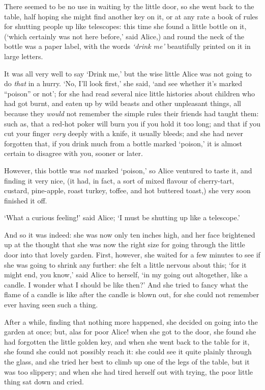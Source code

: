   There seemed to be no use in waiting by the little door, so she
went back to the table, half hoping she might find another key on
it, or at any rate a book of rules for shutting people up like
telescopes:  this time she found a little bottle on it, (`which
certainly was not here before,' said Alice,) and round the neck
of the bottle was a paper label, with the words {\it `drink me'}
beautifully printed on it in large letters.

  It was all very well to say `Drink me,' but the wise little
Alice was not going to do {\it that} in a hurry.  `No, I'll look
first,' she said, `and see whether it's marked ``poison'' or not';
for she had read several nice little histories about children who
had got burnt, and eaten up by wild beasts and other unpleasant
things, all because they {\it would} not remember the simple rules
their friends had taught them:  such as, that a red-hot poker
will burn you if you hold it too long; and that if you cut your
finger {\it very} deeply with a knife, it usually bleeds; and she had
never forgotten that, if you drink much from a bottle marked
`poison,' it is almost certain to disagree with you, sooner or
later.

  However, this bottle was {\it not} marked `poison,' so Alice ventured
to taste it, and finding it very nice, (it had, in fact, a sort
of mixed flavour of cherry-tart, custard, pine-apple, roast
turkey, toffee, and hot buttered toast,) she very soon finished
it off.

  `What a curious feeling!' said Alice; `I must be shutting up
like a telescope.'

  And so it was indeed:  she was now only ten inches high, and
her face brightened up at the thought that she was now the right
size for going through the little door into that lovely garden.
First, however, she waited for a few minutes to see if she was
going to shrink any further:  she felt a little nervous about
this; `for it might end, you know,' said Alice to herself, `in my
going out altogether, like a candle.  I wonder what I should be
like then?'  And she tried to fancy what the flame of a candle is
like after the candle is blown out, for she could not remember
ever having seen such a thing.

  After a while, finding that nothing more happened, she decided
on going into the garden at once; but, alas for poor Alice!
when she got to the door, she found she had forgotten the
little golden key, and when she went back to the table for it,
she found she could not possibly reach it:  she could see it
quite plainly through the glass, and she tried her best to climb
up one of the legs of the table, but it was too slippery;
and when she had tired herself out with trying,
the poor little thing sat down and cried.

